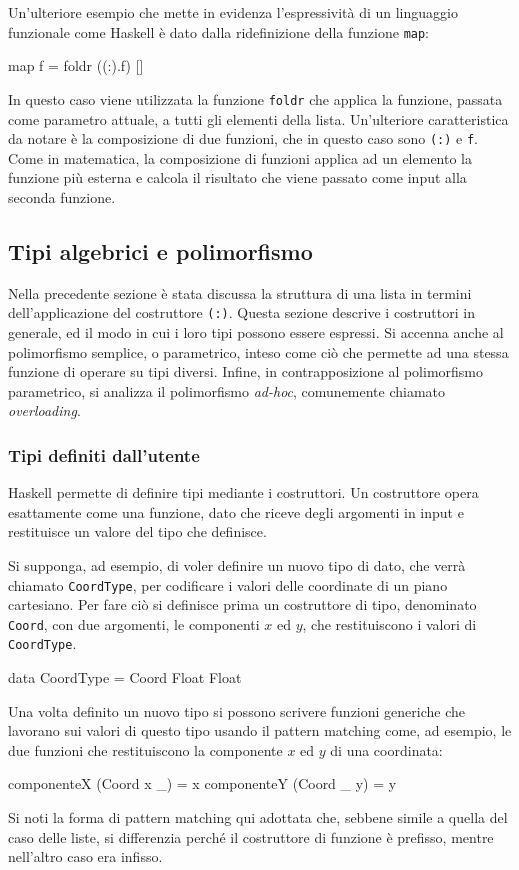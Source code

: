 Un'ulteriore esempio che mette in evidenza l'espressivit\`{a} di un linguaggio funzionale come Haskell \`{e}
dato dalla ridefinizione della funzione \verb"map":
\begin{haskellCode}
map f = foldr ((:).f) []
\end{haskellCode}
In questo caso viene utilizzata la funzione \verb"foldr" che applica la funzione, 
passata come parametro attuale, a tutti gli elementi della lista. Un'ulteriore caratteristica da notare \`{e}
la composizione di due funzioni, che in questo caso sono \verb"(:)" e \verb"f". 
Come in matematica, la composizione di funzioni applica ad un elemento 
la funzione pi\`u esterna e calcola il risultato che viene passato come input alla seconda funzione. 

\subsection{Tipi algebrici e polimorfismo}
Nella precedente sezione \`e stata discussa la struttura di una lista 
in termini dell'applicazione del costruttore \verb"(:)". Questa sezione 
descrive i costruttori in generale, ed il modo in cui i loro tipi possono 
essere espressi. Si accenna anche al polimorfismo semplice, o parametrico, inteso come ci\`o che 
permette ad una stessa funzione di operare su tipi diversi. Infine, in contrapposizione al polimorfismo parametrico, 
si analizza il polimorfismo \emph{ad-hoc}, comunemente chiamato \emph{overloading}.

\subsubsection{Tipi definiti 
dall'utente}
Haskell permette di definire tipi mediante i costruttori. Un 
costruttore opera esattamente come una funzione, dato che riceve degli 
argomenti in input e restituisce un valore del tipo che definisce.

Si supponga, ad esempio, di voler definire un nuovo tipo di dato, che verr\`a chiamato 
\verb"CoordType", per codificare i valori delle coordinate di un piano 
cartesiano. Per fare ci\`o si definisce prima un costruttore di tipo, denominato \verb"Coord",
 con due argomenti, le componenti $x$ ed $y$, che 
restituiscono i valori di \verb"CoordType". 
\begin{haskellCode}
data CoordType = Coord Float Float
\end{haskellCode}

Una volta definito un nuovo tipo si possono scrivere funzioni generiche che 
lavorano sui valori di questo tipo usando il pattern matching come, ad 
esempio, le due funzioni che restituiscono la componente $x$ ed $y$ di una 
coordinata:
\begin{haskellCode}
componenteX (Coord x _) = x
componenteY (Coord _ y) = y
\end{haskellCode}
%
Si noti la forma di pattern matching qui adottata che, sebbene simile a quella 
del caso delle liste, si differenzia perch\'e il costruttore di 
funzione \`e prefisso, mentre nell'altro caso era infisso. 

